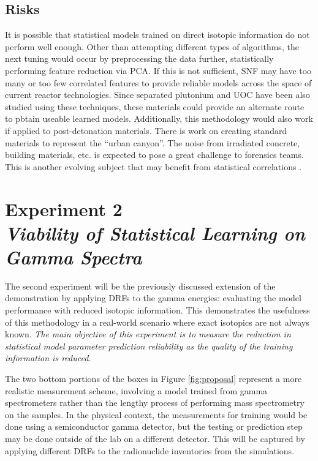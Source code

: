 \subsection*{Risks}

It is possible that statistical models trained on direct isotopic information
do not perform well enough.  Other than attempting different types of
algorithms, the next tuning would occur by preprocessing the data further,
statistically performing feature reduction via \gls{PCA}. If this is not
sufficient, \gls{SNF} may have too many or too few correlated features to
provide reliable models across the space of current reactor technologies. Since
separated plutonium and \gls{UOC} have been also studied using these
techniques, these materials could provide an alternate route to pbtain useable
learned models. Additionally, this methodology would also work if applied to
post-detonation materials. There is work on creating standard materials to
represent the ``urban canyon''. The noise from irradiated concrete, building
materials, etc. is expected to pose a great challenge to forensics teams. This
is another evolving subject that may benefit from statistical correlations
\cite{refmaterial}.

\section[Experiment 2: Gamma Spectra]{Experiment 2\\ 
\large{\textit{Viability of Statistical Learning on Gamma Spectra}}}
\label{sec:exp2}

The second experiment will be the previously discussed extension of the
demonstration by applying \glspl{DRF} to the gamma energies: evaluating the
model performance with reduced isotopic information.  This demonstrates the
usefulness of this methodology in a real-world scenario where exact isotopics
are not always known.   \textit{The main objective of this experiment is to
measure the reduction in statistical model parameter prediction reliability as
the quality of the training information is reduced.}

The two bottom portions of the boxes in Figure \ref{fig:proposal} represent a
more realistic measurement scheme, involving a model trained from gamma
spectrometers rather than the lengthy process of performing mass spectrometry
on the samples.  In the physical context, the measurements for training would
be done using a semiconductor gamma detector, but the testing or prediction
step may be done outside of the lab on a different detector.  This will be
captured by applying different \glspl{DRF} to the radionuclide
inventories from the simulations.


